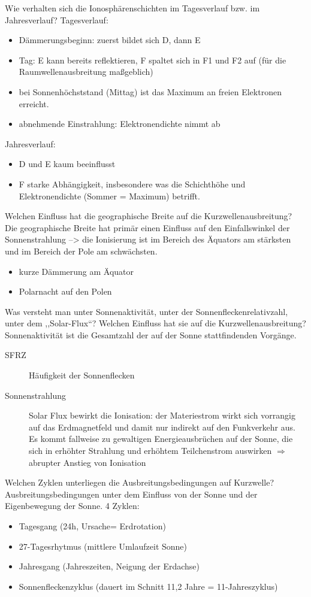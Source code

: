 \documentclass[avery5371,grid,frame,a4paper]{flashcards}
\newcommand{\card}[3]{
  \begin{flashcard}[{\chap} -- #1]{#2}#3\end{flashcard}
}
\begin{document}
\card{22}{Wie verhalten sich die Ionosphärenschichten im Tagesverlauf bzw. im Jahresverlauf?}{
  \footnotesize
  Tagesverlauf:
  \begin{itemize}\itemsep0pt
    \item Dämmerungsbeginn: zuerst bildet sich D, dann E
    \item Tag: E kann bereits reflektieren, F spaltet sich in F1 und F2  auf (für die Raumwellenausbreitung maßgeblich)
    \item bei Sonnenhöchststand (Mittag) ist das Maximum an freien Elektronen erreicht.
    \item abnehmende Einstrahlung: Elektronendichte nimmt ab
  \end{itemize}

  Jahresverlauf:
  \begin{itemize}\itemsep0pt
    \item D und E kaum beeinflusst
    \item F starke Abhängigkeit, insbesondere was die Schichthöhe und Elektronendichte (Sommer = Maximum) betrifft.
  \end{itemize}
}
\card{23}{Welchen Einfluss hat die geographische Breite auf die Kurzwellenausbreitung?}{
  Die geographische Breite hat primär einen Einfluss auf den Einfallswinkel der Sonnenstrahlung --> die Ionisierung ist im Bereich des Äquators am stärksten und im Bereich der Pole am schwächsten.
  \begin{itemize}
    \item kurze Dämmerung am Äquator
    \item Polarnacht auf den Polen
  \end{itemize}
}
\card{24}{Was versteht man unter Sonnenaktivität, unter der Sonnenfleckenrelativzahl, unter dem ,,Solar-Flux``? Welchen Einfluss hat sie auf die Kurzwellenausbreitung?}{
  \small
  Sonnenaktivität ist die Gesamtzahl der auf der Sonne stattfindenden Vorgänge.
  \begin{description}
    \item[SFRZ] Häufigkeit der Sonnenflecken
    \item[Sonnenstrahlung] Solar Flux bewirkt die Ionisation: der Materiestrom wirkt sich vorrangig auf das Erdmagnetfeld und damit nur indirekt auf den Funkverkehr aus. Es kommt fallweise zu gewaltigen Energieausbrüchen auf der Sonne, die sich in erhöhter Strahlung und erhöhtem Teilchenstrom auswirken $\Rightarrow$ abrupter Anstieg von Ionisation
  \end{description}
}
\card{25}{Welchen Zyklen unterliegen die Ausbreitungsbedingungen auf Kurzwelle?}{
  Ausbreitungsbedingungen unter dem Einfluss von der Sonne und der Eigenbewegung der Sonne.
  4 Zyklen:
  \begin{itemize}
    \item Tagesgang (24h, Ursache= Erdrotation)
    \item 27-Tagesrhytmus (mittlere Umlaufzeit Sonne)
    \item Jahresgang (Jahreszeiten, Neigung der Erdachse)
    \item Sonnenfleckenzyklus (dauert im Schnitt 11,2 Jahre = 11-Jahreszyklus)
  \end{itemize}
}
\end{document}

